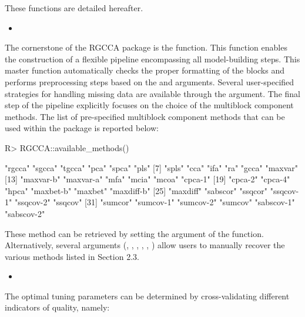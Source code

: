 \documentclass[
]{jss}
\begin{document}
These functions are detailed hereafter.

\begin{itemize}
\item
\end{itemize}

The cornerstone of the RGCCA package is the  function.
This function enables the construction of a flexible pipeline
encompassing all model-building steps. This master function
automatically checks the proper formatting of the blocks and performs
preprocessing steps based on the  and 
arguments. Several user-specified strategies for handling missing data
are available through the  argument. The final step of
the pipeline explicitly focuses on the choice of the multiblock
component methods. The list of pre-specified multiblock component
methods that can be used within the  package is reported
below:

\footnotesize

\begin{CodeChunk}
\begin{CodeInput}
R> RGCCA::available_methods()
\end{CodeInput}
\begin{CodeOutput}
 [1] "rgcca"     "sgcca"     "tgcca"     "pca"       "spca"      "pls"      
 [7] "spls"      "cca"       "ifa"       "ra"        "gcca"      "maxvar"   
[13] "maxvar-b"  "maxvar-a"  "mfa"       "mcia"      "mcoa"      "cpca-1"   
[19] "cpca-2"    "cpca-4"    "hpca"      "maxbet-b"  "maxbet"    "maxdiff-b"
[25] "maxdiff"   "sabscor"   "ssqcor"    "ssqcov-1"  "ssqcov-2"  "ssqcov"   
[31] "sumcor"    "sumcov-1"  "sumcov-2"  "sumcov"    "sabscov-1" "sabscov-2"
\end{CodeOutput}
\end{CodeChunk}

\normalsize

These method can be retrieved by setting the  argument of
the  function. Alternatively, several arguments
(, , , ,
, ) allow users to manually recover the
various methods listed in Section 2.3.

\begin{itemize}
\item
\end{itemize}

The optimal tuning parameters can be determined by cross-validating
different indicators of quality, namely:
\end{document}

